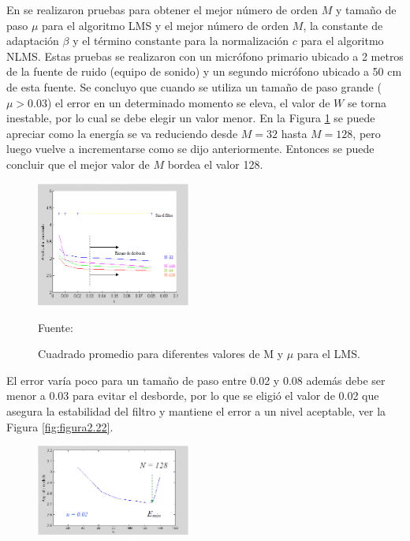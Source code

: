 \begin{enumerate}
\newpage
En \citep{simon} se realizaron pruebas para obtener el mejor número de orden $M$ y tamaño de paso $\mu$ para el algoritmo LMS y el mejor número de orden $M$, la constante de adaptación $\beta$ y el término constante para la normalización $c$ para el algoritmo NLMS. Estas pruebas se realizaron con un micrófono primario ubicado a 2 metros de la fuente de ruido (equipo de sonido) y un segundo micrófono ubicado a 50 cm de esta fuente. Se concluyo que cuando se utiliza un tamaño de paso grande ($\mu > 0.03$) el error en un determinado momento se eleva, el valor de $W$ se torna inestable, por lo cual se debe elegir un valor menor. 
\vskip 0.5cm
En la Figura \ref{fig:figura2.21} se puede apreciar como la energía se va reduciendo desde $M=32$ hasta $M=128$, pero luego vuelve a incrementarse como se dijo anteriormente. Entonces se puede concluir que el mejor valor de $M$ bordea el valor 128.
\vskip 0.2cm
\begin{figure}[ht]
\begin{center}
\includegraphics[width=0.45\textwidth]{Imagenes/Cap2/image022}
\end{center}
\begin{center}
\vskip -0.5cm
\caption{\small{Cuadrado promedio para diferentes valores de M y $\mu$ para el LMS.}}
\label{fig:figura2.21}
{\small{Fuente: \cite{simon}}}
\end{center}
\end{figure}
\newpage
El error varía poco para un tamaño de paso entre 0.02 y 0.08 además debe ser menor a 0.03 para evitar el desborde, por lo que se eligió el valor de 0.02 que asegura la estabilidad del filtro y mantiene el error a un nivel aceptable, ver la Figura \ref{fig:figura2.22}.
\vskip 0.2cm
\begin{figure}[ht]
\begin{center}
\includegraphics[width=0.45\textwidth]{Imagenes/Cap2/image023}

\end{center}
\end{figure}
\end{enumerate}
